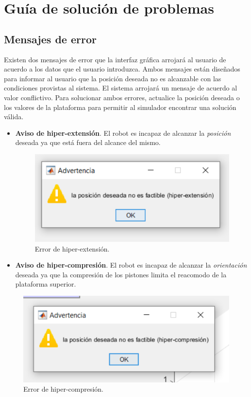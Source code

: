 \chapter{Guía de solución de problemas}
\label{chapter: troubleshooting}

\section{Mensajes de error}
Existen dos mensajes de error que la interfaz gráfica arrojará
al usuario de acuerdo a los datos que el usuario introduzca.
Ambos mensajes están diseñados para informar al usuario que
la posición deseada no es alcanzable con las condiciones provistas
al sistema.
El sistema arrojará un mensaje de acuerdo al valor conflictivo.
Para solucionar ambos errores, actualice la posición deseada 
o los valores de la plataforma para permitir al simulador
encontrar una solución válida.

\begin{itemize}
 \item \textbf{Aviso de hiper-extensión}. El robot es incapaz 
 de alcanzar la \emph{posición} deseada ya que está fuera del alcance 
 del mismo. 
 
 \begin{figure}[h]
 \centering
 \includegraphics[scale=0.3]{img/hiperextension.png}
 \caption{Error de hiper-extensión.}
 \label{fig: hyper-extension}
\end{figure}

 
  \item \textbf{Aviso de hiper-compresión}. El robot es incapaz 
 de alcanzar la \emph{orientación} deseada ya que la compresión
 de los pistones limita el reacomodo de la plataforma superior.
 \end{itemize}
  
 \begin{figure}[h]
 \centering
 \includegraphics[scale=0.3]{img/hipercompresion.png}
 \caption{Error de hiper-compresión.}
 \label{fig: hyper-compresion}
\end{figure}

